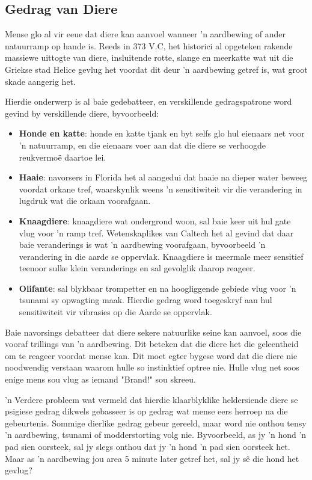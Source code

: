 \label{m38779*eip-745}
\subsection*{Gedrag van Diere}
\nopagebreak
Mense glo al vir eeue dat diere kan aanvoel wanneer 'n aardbewing of ander natuurramp op hande is. Reeds in 373 V.C, het historici al opgeteken rakende massiewe uittogte van diere, insluitende rotte, slange en meerkatte wat uit die Griekse stad Helice gevlug het voordat dit deur 'n aardbewing getref is, wat groot skade aangerig het.  \par 
Hierdie onderwerp is al baie gedebatteer, en verskillende gedragspatrone word gevind by verskillende diere, byvoorbeeld: \par 
\begin{itemize}[noitemsep]
\item \textbf{Honde en katte}: honde en katte tjank en byt selfs glo hul eienaars net voor 'n natuurramp, en die eienaars voer aan dat die diere se verhoogde reukvermo\"e daartoe lei.
\item \textbf{Haaie}: navorsers in Florida het al aangedui dat haaie na dieper water beweeg voordat orkane tref, waarskynlik weens 'n sensitiwiteit vir die verandering in lugdruk wat die orkaan voorafgaan. 
\item \textbf{Knaagdiere}: knaagdiere wat ondergrond woon, sal baie keer uit hul gate vlug voor 'n ramp tref. Wetenskaplikes van Caltech het al gevind dat daar baie veranderings is wat 'n aardbewing voorafgaan, byvoorbeeld 'n verandering in die aarde se oppervlak. Knaagdiere is meermale meer sensitief teenoor sulke klein veranderings en sal gevolglik daarop reageer. 
\item \textbf{Olifante}: sal blykbaar trompetter en na hoogliggende gebiede vlug voor 'n tsunami sy opwagting maak. Hierdie gedrag word toegeskryf aan hul sensitiwiteit vir vibrasies op die Aarde se oppervlak. \end{itemize}
Baie navorsings debatteer dat diere sekere natuurlike seine kan aanvoel, soos die vooraf trillings van 'n aardbewing. Dit beteken dat die diere het die geleentheid om te reageer voordat mense kan. Dit moet egter bygese word dat die diere nie noodwendig verstaan waarom hulle so instinktief optree nie. Hulle vlug net soos enige mens sou vlug as iemand "Brand!" sou skreeu. \par 
'n Verdere probleem wat vermeld dat hierdie klaarblyklike heldersiende diere se psigiese gedrag dikwels gebasseer is op gedrag wat mense eers herroep na die gebeurtenis. Sommige dierlike gedrag gebeur gereeld, maar word nie onthou tensy 'n aardbewing, tsunami of modderstorting volg nie. Byvoorbeeld, as jy 'n hond 'n pad sien oorsteek, sal jy slegs onthou dat jy 'n hond 'n pad sien oorsteek het. Maar as 'n aardbewing jou area 5 minute later getref het, sal jy s\^e die hond het gevlug?  \par 

